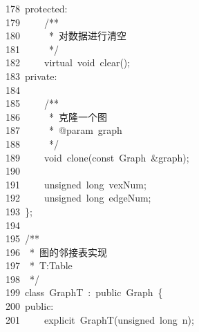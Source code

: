 \documentclass{ctexart}
\newcommand{\hlstd}[1]{\textcolor[rgb]{0.2,0.2,0.2}{#1}}
\newcommand{\hlcom}[1]{\textcolor[rgb]{0.59,0.59,0.59}{#1}}
\newcommand{\hlopt}[1]{\textcolor[rgb]{0.2,0.2,0.2}{#1}}
\newcommand{\hllin}[1]{\textcolor[rgb]{0.59,0.59,0.59}{#1}}
\newcommand{\hlkwb}[1]{\textcolor[rgb]{0.63,0,0.31}{#1}}
\newcommand{\hlkwc}[1]{\textcolor[rgb]{0,0.63,0.31}{#1}}
\newcommand{\hlkwd}[1]{\textcolor[rgb]{0.78,0.23,0.41}{#1}}
\begin{document}
\hllin{178\ }\hlstd{}\hlkwc{protected}\hlstd{}\hlopt{:}\\
\hllin{179\ }\hlstd{}\hlstd{\ \ \ \ }\hlstd{}\hlcom{/{*}{*}}\\
\hllin{180\ }\hlcom{}\hlstd{\ \ \ \ \ }\hlcom{{*}\ 对数据进行清空}\\
\hllin{181\ }\hlcom{}\hlstd{\ \ \ \ \ }\hlcom{{*}/}\hlstd{}\\
\hllin{182\ }\hlstd{}\hlstd{\ \ \ \ }\hlstd{}\hlkwc{virtual\ }\hlstd{}\hlkwb{void\ }\hlstd{}\hlkwd{clear}\hlstd{}\hlopt{();}\\
\hllin{183\ }\hlstd{}\hlkwc{private}\hlstd{}\hlopt{:}\\
\hllin{184\ }\hlstd{}\\
\hllin{185\ }\hlstd{}\hlstd{\ \ \ \ }\hlstd{}\hlcom{/{*}{*}}\\
\hllin{186\ }\hlcom{}\hlstd{\ \ \ \ \ }\hlcom{{*}\ 克隆一个图}\\
\hllin{187\ }\hlcom{}\hlstd{\ \ \ \ \ }\hlcom{{*}\ @param\ graph}\\
\hllin{188\ }\hlcom{}\hlstd{\ \ \ \ \ }\hlcom{{*}/}\hlstd{}\\
\hllin{189\ }\hlstd{}\hlstd{\ \ \ \ }\hlstd{}\hlkwb{void\ }\hlstd{}\hlkwd{clone}\hlstd{}\hlopt{(}\hlstd{}\hlkwb{const\ }\hlstd{Graph\ }\hlopt{\&}\hlstd{graph}\hlopt{);}\\
\hllin{190\ }\hlstd{}\\
\hllin{191\ }\hlstd{}\hlstd{\ \ \ \ }\hlstd{}\hlkwb{unsigned\ long\ }\hlstd{vexNum}\hlopt{;}\\
\hllin{192\ }\hlstd{}\hlstd{\ \ \ \ }\hlstd{}\hlkwb{unsigned\ long\ }\hlstd{edgeNum}\hlopt{;}\\
\hllin{193\ }\hlstd{}\hlopt{\};}\\
\hllin{194\ }\hlstd{}\\
\hllin{195\ }\hlstd{}\hlcom{/{*}{*}}\\
\hllin{196\ }\hlcom{\ {*}\ 图的邻接表实现}\\
\hllin{197\ }\hlcom{\ {*}\ T:Table}\\
\hllin{198\ }\hlcom{\ {*}/}\hlstd{}\\
\hllin{199\ }\hlstd{}\hlkwc{class\ }\hlstd{GraphT\ }\hlopt{:\ }\hlstd{}\hlkwc{public\ }\hlstd{Graph\ }\hlopt{\{}\\
\hllin{200\ }\hlstd{}\hlkwc{public}\hlstd{}\hlopt{:}\\
\hllin{201\ }\hlstd{}\hlstd{\ \ \ \ }\hlstd{}\hlkwc{explicit\ }\hlstd{}\hlkwd{GraphT}\hlstd{}\hlopt{(}\hlstd{}\hlkwb{unsigned\ long\ }\hlstd{n}\hlopt{);}\\
\end{document}
